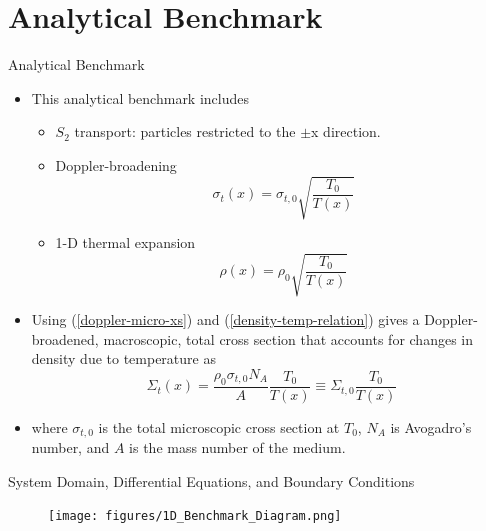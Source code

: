\documentclass[9pt,t,aspectratio=169]{beamer}
\begin{document}
\section{Analytical Benchmark}
\begin{frame}{Analytical Benchmark}
    \pause
    \begin{itemize}
        \item <2-> This analytical benchmark includes
        \begin{itemize}
            \item <3-> $S_{2}$ transport: particles restricted to the $\pm$x direction.
            \item <4-> Doppler-broadening
            \begin{equation}\label{doppler-micro-xs}
                \sigma_{t}(x) = \sigma_{t,0}\sqrt{\frac{T_{0}}{T(x)}}
            \end{equation}
            \item <5-> 1-D thermal expansion
            \begin{equation} \label{density-temp-relation}
                \rho(x) =  \rho_{0} \sqrt{\frac{T_{0}}{T(x)}}
            \end{equation}
        \end{itemize}\vspace*{-0.4cm}
        \item <6->  Using (\ref{doppler-micro-xs}) and (\ref{density-temp-relation}) gives a Doppler-broadened, macroscopic, total cross section that accounts for changes in density due to temperature as
        \begin{equation}
            \Sigma_{t}(x) = \frac{\rho_{0}\sigma_{t,0} N_{A}}{A} \frac{T_{0}}{T(x)}
            \equiv\Sigma_{t,0}\frac{T_{0}}{T(x)}
        \end{equation}
        \item <7-> where $ \sigma_{t,0}$ is the total microscopic cross section at $T_{0}$, $N_{A}$ is Avogadro's number, and $A$ is the mass number
        of the medium.
        \end{itemize}
\end{frame}



\begin{frame}{System Domain, Differential Equations, and Boundary Conditions}
    \vspace*{-0.45cm}
    \begin{figure}[T]
        \centering
        \texttt{[image: figures/1D\_Benchmark\_Diagram.png]}
    \end{figure}
\end{frame}
\end{document}
